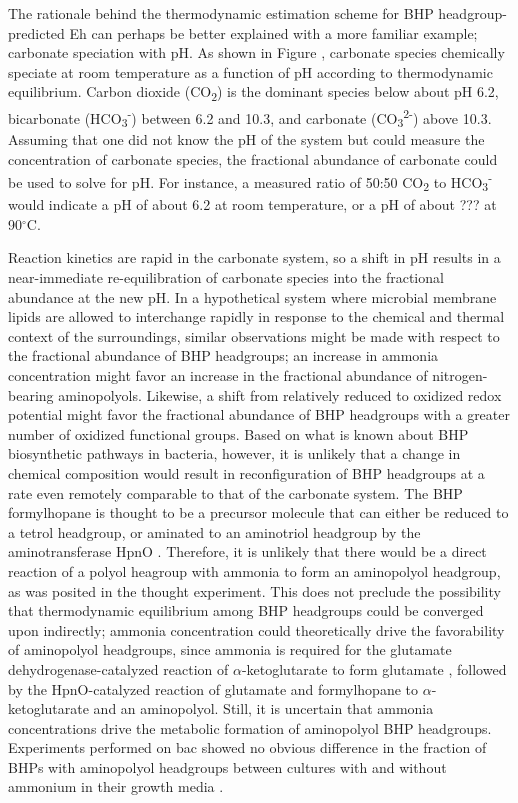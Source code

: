 The rationale behind the thermodynamic estimation scheme for BHP headgroup-predicted Eh can perhaps be better explained with a more familiar example; carbonate speciation with pH. As shown in Figure , carbonate species chemically speciate at room temperature as a function of pH according to thermodynamic equilibrium. Carbon dioxide (CO\textsubscript{2}) is the dominant species below about pH 6.2, bicarbonate (HCO\textsubscript{3}\textsuperscript{-}) between 6.2 and 10.3, and carbonate (CO\textsubscript{3}\textsuperscript{2-}) above 10.3. Assuming that one did not know the pH of the system but could measure the concentration of carbonate species, the fractional abundance of carbonate could be used to solve for pH. For instance, a measured ratio of 50:50 CO\textsubscript{2} to HCO\textsubscript{3}\textsuperscript{-} would indicate a pH of about 6.2 at room temperature, or a pH of about ??? at 90$^{\circ}$C.

Reaction kinetics are rapid in the carbonate system, so a shift in pH results in a near-immediate re-equilibration of carbonate species into the fractional abundance at the new pH. In a hypothetical system where microbial membrane lipids are allowed to interchange rapidly in response to the chemical and thermal context of the surroundings, similar observations might be made with respect to the fractional abundance of BHP headgroups; an increase in ammonia concentration might favor an increase in the fractional abundance of nitrogen-bearing aminopolyols. Likewise, a shift from relatively reduced to oxidized redox potential might favor the fractional abundance of BHP headgroups with a greater number of oxidized functional groups. Based on what is known about BHP biosynthetic pathways in bacteria, however, it is unlikely that a change in chemical composition would result in reconfiguration of BHP headgroups at a rate even remotely comparable to that of the carbonate system. The BHP formylhopane is thought to be a precursor molecule that can either be reduced to a tetrol headgroup, or aminated to an aminotriol headgroup by the aminotransferase HpnO \citep{welander2012identification}. Therefore, it is unlikely that there would be a direct reaction of a polyol heagroup with ammonia to form an aminopolyol headgroup, as was posited in the thought experiment. This does not preclude the possibility that thermodynamic equilibrium among BHP headgroups could be converged upon indirectly; ammonia concentration could theoretically drive the favorability of aminopolyol headgroups, since ammonia is required for the glutamate dehydrogenase-catalyzed reaction of $\alpha$-ketoglutarate to form glutamate \citep{}, followed by the HpnO-catalyzed reaction of glutamate and formylhopane to $\alpha$-ketoglutarate and an aminopolyol. Still, it is uncertain that ammonia concentrations drive the metabolic formation of aminopolyol BHP headgroups. Experiments performed on bac showed no obvious difference in the fraction of BHPs with aminopolyol headgroups between cultures with and without ammonium in their growth media \citep{}.




